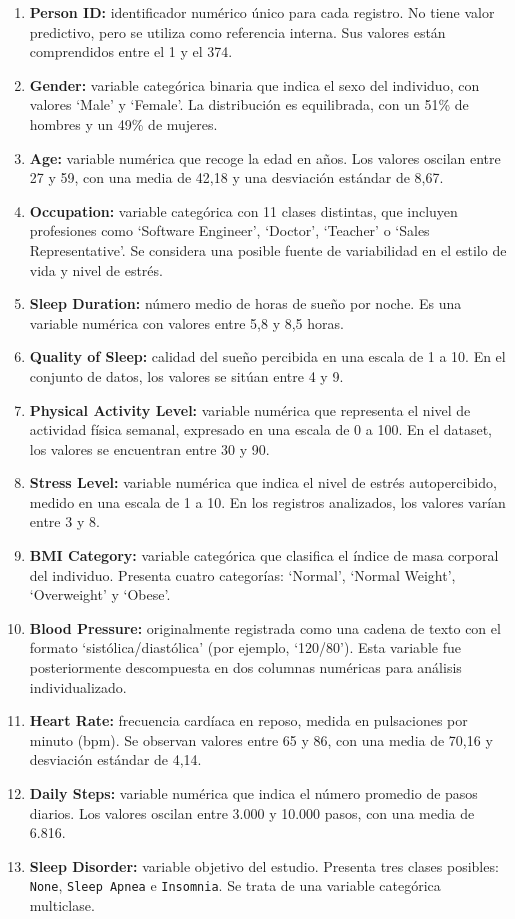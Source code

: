 \begin{enumerate}
    \item \textbf{Person ID:} identificador numérico único para cada registro. No tiene valor predictivo, pero se utiliza como referencia interna. Sus valores están comprendidos entre el 1 y el 374.
    \item \textbf{Gender:} variable categórica binaria que indica el sexo del individuo, con valores ‘Male’ y ‘Female’. La distribución es equilibrada, con un 51\% de hombres y un 49\% de mujeres. 
    \item \textbf{Age:} variable numérica que recoge la edad en años. Los valores oscilan entre 27 y 59, con una media de 42,18 y una desviación estándar de 8,67.
    \item \textbf{Occupation:} variable categórica con 11 clases distintas, que incluyen profesiones como ‘Software Engineer’, ‘Doctor’, ‘Teacher’ o ‘Sales Representative’. Se considera una posible fuente de variabilidad en el estilo de vida y nivel de estrés. 
    \item \textbf{Sleep Duration: }número medio de horas de sueño por noche. Es una variable numérica con valores entre 5,8 y 8,5 horas.
    \item \textbf{Quality of Sleep:} calidad del sueño percibida en una escala de 1 a 10. En el conjunto de datos, los valores se sitúan entre 4 y 9.
    \item \textbf{Physical Activity Level: } variable numérica que representa el nivel de actividad física semanal, expresado en una escala de 0 a 100. En el dataset, los valores se encuentran entre 30 y 90. 
    \item \textbf{Stress Level:} variable numérica que indica el nivel de estrés autopercibido, medido en una escala de 1 a 10. En los registros analizados, los valores varían entre 3 y 8.
    \item \textbf{BMI Category: } variable categórica que clasifica el índice de masa corporal del individuo. Presenta cuatro categorías: ‘Normal’, ‘Normal Weight’, ‘Overweight’ y ‘Obese’. 
    \item \textbf{Blood Pressure: }originalmente registrada como una cadena de texto con el formato ‘sistólica/diastólica’ (por ejemplo, ‘120/80’). Esta variable fue posteriormente descompuesta en dos columnas numéricas para análisis individualizado. 
    \item \textbf{Heart Rate: } frecuencia cardíaca en reposo, medida en pulsaciones por minuto (bpm). Se observan valores entre 65 y 86, con una media de 70,16 y desviación estándar de 4,14. 
    \item \textbf{Daily Steps: } variable numérica que indica el número promedio de pasos diarios. Los valores oscilan entre 3.000 y 10.000 pasos, con una media de 6.816. 
    \item \textbf{Sleep Disorder: } variable objetivo del estudio. Presenta tres clases posibles: \texttt{None}, \texttt{Sleep Apnea} e \texttt{Insomnia}. Se trata de una variable categórica multiclase. 
\end{enumerate}


